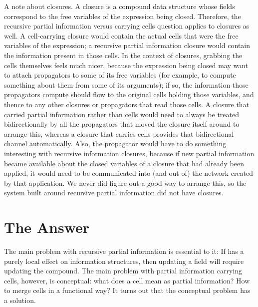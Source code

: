 \documentclass[12pt,letterpaper]{article}
\begin{document}
A note about closures.  A closure is a compound data structure whose
fields correspond to the free variables of the expression being
closed.  Therefore, the recursive partial information versus carrying
cells question applies to closures as well.  A cell-carrying closure
would contain the actual cells that were the free variables of the
expression; a recursive partial information closure would contain the
information present in those cells.  In the context of closures,
grabbing the cells themselves feels much nicer, because the expression
being closed may want to attach propagators to some of its free
variables (for example, to compute something about them from some of
its arguments); if so, the information those propagators compute
should flow to the original cells holding those variables, and thence
to any other closures or propagators that read those cells.  A closure
that carried partial information rather than cells would need to
always be treated bidirectionally by all the propagators that moved
the closure itself around to arrange this, whereas a closure that
carries cells provides that bidirectional channel automatically.
  Also, the  propagator would
have to do something interesting with recursive information closures,
because if new partial information became available about the closed
variables of a closure that had already been applied, it would need to
be communicated into (and out of) the network created by that
application.  We never did figure out a good way to arrange this, so
the system built around recursive partial information did not have
closures.

\section{The Answer}

The main problem with recursive partial information is essential to
it: If  has a purely local effect on information
structures, then updating a field will require updating the compound.
The main problem with partial information carrying cells, however, is
conceptual: what does a cell mean as partial information?  How to
merge cells in a functional way?  It turns out that the conceptual
problem has a solution.
\end{document}
